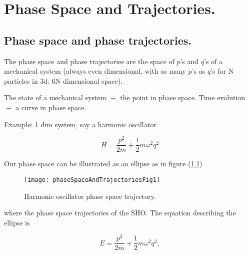 %
%

\chapter{Phase Space and Trajectories.}
\label{chap:phaseSpaceAndTrajectories}
{}
\date{Feb 29, 2012}

\beginArtWithToc

\section{Phase space and phase trajectories.}

The phase space and phase trajectories are the space of $p$'s and $q$'s of a mechanical system (always even dimensional, with as many $p$'s as $q$'s for N particles in 3d: 6N dimensional space).

The state of a mechanical system $\equiv$ the point in phase space.
Time evolution $\equiv$ a curve in phase space.

Example: 1 dim system, say a harmonic oscillator.

\begin{equation}\label{eqn:phaseSpaceAndTrajectories:10}
H = \frac{p^2}{2m} + \frac{1}{2} m \omega^2 q^2
\end{equation}

Our phase space can be illustrated as an ellipse as in figure (\ref{fig:phaseSpaceAndTrajectories:phaseSpaceAndTrajectoriesFig1})
\begin{figure}[htp]
   \centering
   \texttt{[image: phaseSpaceAndTrajectoriesFig1]}
   \caption{Harmonic oscillator phase space trajectory.}\label{fig:phaseSpaceAndTrajectories:phaseSpaceAndTrajectoriesFig1}
\end{figure}

where the phase space trajectories of the SHO.  The equation describing the ellipse is

\begin{equation}\label{eqn:phaseSpaceAndTrajectories:30}
E = \frac{p^2}{2m} + \frac{1}{2} m \omega^2 q^2,
\end{equation}

